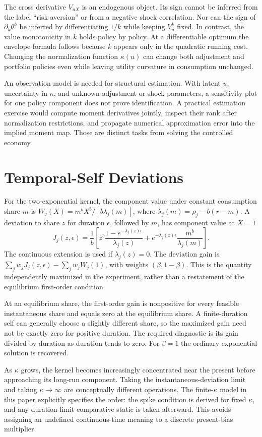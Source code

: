 \documentclass[ecta,draft]{econsocart}
\begin{document}
The cross derivative $V_{uX}$ is an endogenous object. Its sign cannot be inferred from the label ``risk aversion'' or from a negative shock correlation. Nor can the sign of $\partial_k\theta^k$ be inferred by differentiating $1/k$ while keeping $V_u^k$ fixed. In contrast, the value monotonicity in $k$ holds policy by policy. At a differentiable optimum the envelope formula follows because $k$ appears only in the quadratic running cost. Changing the normalization function $\kappa(u)$ can change both adjustment and portfolio policies even while leaving utility curvature in consumption unchanged.

An observation model is needed for structural estimation. With latent $u$, uncertainty in $\kappa$, and unknown adjustment or shock parameters, a sensitivity plot for one policy component does not prove identification. A practical estimation exercise would compute moment derivatives jointly, inspect their rank after normalization restrictions, and propagate numerical approximation error into the implied moment map. Those are distinct tasks from solving the controlled economy.

\section{Temporal-Self Deviations}
For the two-exponential kernel, the component value under constant consumption share $m$ is $W_j(X)=m^bX^b/[b\lambda_j(m)]$, where $\lambda_j(m)=\rho_j-b(r-m)$. A deviation to share $z$ for duration $\epsilon$, followed by $m$, has component value at $X=1$
\[
 J_j(z,\epsilon)=\frac1b\left[
 z^b\frac{1-e^{-\lambda_j(z)\epsilon}}{\lambda_j(z)}
 +e^{-\lambda_j(z)\epsilon}\frac{m^b}{\lambda_j(m)}\right].
\]
The continuous extension is used if $\lambda_j(z)=0$. The deviation gain is $\sum_jw_jJ_j(z,\epsilon)-\sum_jw_jW_j(1)$, with weights $(\beta,1-\beta)$. This is the quantity independently maximized in the experiment, rather than a restatement of the equilibrium first-order condition.

At an equilibrium share, the first-order gain is nonpositive for every feasible instantaneous share and equals zero at the equilibrium share. A finite-duration self can generally choose a slightly different share, so the maximized gain need not be exactly zero for positive duration. The required diagnostic is its gain divided by duration as duration tends to zero. For $\beta=1$ the ordinary exponential solution is recovered.

As $\kappa$ grows, the kernel becomes increasingly concentrated near the present before approaching its long-run component. Taking the instantaneous-deviation limit and taking $\kappa\to\infty$ are conceptually different operations. The finite-$\kappa$ model in this paper explicitly specifies the order: the spike condition is derived for fixed $\kappa$, and any duration-limit comparative static is taken afterward. This avoids assigning an undefined continuous-time meaning to a discrete present-bias multiplier.
\end{document}
